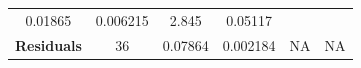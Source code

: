 \documentclass[]{article}
\begin{document}
\begin{longtable}[]{@{}cccccc@{}}
\begin{minipage}[t]{0.10\columnwidth}
0.01865
\strut\end{minipage} &
\begin{minipage}[t]{0.12\columnwidth}\centering\strut
0.006215
\strut\end{minipage} &
\begin{minipage}[t]{0.12\columnwidth}\centering\strut
2.845
\strut\end{minipage} &
\begin{minipage}[t]{0.12\columnwidth}\centering\strut
0.05117
\strut\end{minipage}\tabularnewline
\begin{minipage}[t]{0.19\columnwidth}\centering\strut
\textbf{Residuals}
\strut\end{minipage} &
\begin{minipage}[t]{0.06\columnwidth}\centering\strut
36
\strut\end{minipage} &
\begin{minipage}[t]{0.10\columnwidth}\centering\strut
0.07864
\strut\end{minipage} &
\begin{minipage}[t]{0.12\columnwidth}\centering\strut
0.002184
\strut\end{minipage} &
\begin{minipage}[t]{0.12\columnwidth}\centering\strut
NA
\strut\end{minipage} &
\begin{minipage}[t]{0.12\columnwidth}\centering\strut
NA
\strut\end{minipage}\tabularnewline
\bottomrule
\end{longtable}
\end{document}
